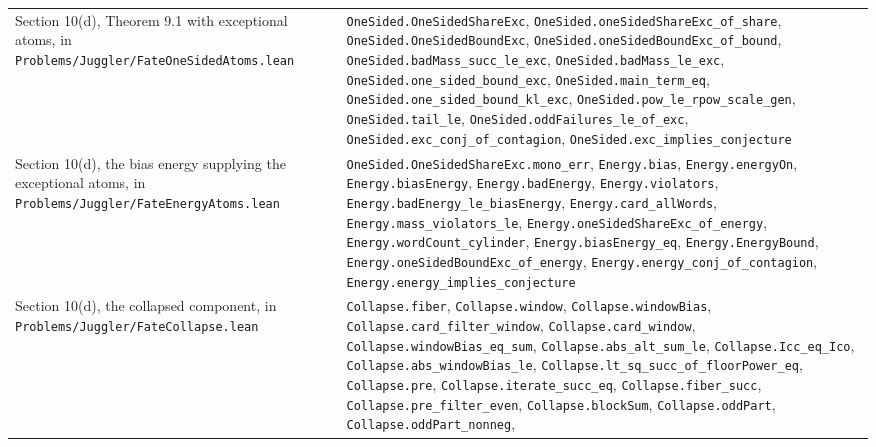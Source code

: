 \documentclass[11pt,a4paper]{article}
\begin{document}
\begin{longtable}[]{@{}
  >{\raggedright\arraybackslash}p{}
  >{\raggedright\arraybackslash}p{}@{}}
Section 10(d), Theorem 9.1 with exceptional atoms, in
\texttt{\nolinkurl{Problems/Juggler/FateOneSidedAtoms.lean}} &
\texttt{\nolinkurl{OneSided.OneSidedShareExc}},
\texttt{\nolinkurl{OneSided.oneSidedShareExc_of_share}},
\texttt{\nolinkurl{OneSided.OneSidedBoundExc}},
\texttt{\nolinkurl{OneSided.oneSidedBoundExc_of_bound}},
\texttt{\nolinkurl{OneSided.badMass_succ_le_exc}},
\texttt{\nolinkurl{OneSided.badMass_le_exc}},
\texttt{\nolinkurl{OneSided.one_sided_bound_exc}},
\texttt{\nolinkurl{OneSided.main_term_eq}},
\texttt{\nolinkurl{OneSided.one_sided_bound_kl_exc}},
\texttt{\nolinkurl{OneSided.pow_le_rpow_scale_gen}},
\texttt{\nolinkurl{OneSided.tail_le}},
\texttt{\nolinkurl{OneSided.oddFailures_le_of_exc}},
\texttt{\nolinkurl{OneSided.exc_conj_of_contagion}},
\texttt{\nolinkurl{OneSided.exc_implies_conjecture}} \\
Section 10(d), the bias energy supplying the exceptional atoms, in
\texttt{\nolinkurl{Problems/Juggler/FateEnergyAtoms.lean}} &
\texttt{\nolinkurl{OneSided.OneSidedShareExc.mono_err}},
\texttt{\nolinkurl{Energy.bias}}, \texttt{\nolinkurl{Energy.energyOn}},
\texttt{\nolinkurl{Energy.biasEnergy}},
\texttt{\nolinkurl{Energy.badEnergy}},
\texttt{\nolinkurl{Energy.violators}},
\texttt{\nolinkurl{Energy.badEnergy_le_biasEnergy}},
\texttt{\nolinkurl{Energy.card_allWords}},
\texttt{\nolinkurl{Energy.mass_violators_le}},
\texttt{\nolinkurl{Energy.oneSidedShareExc_of_energy}},
\texttt{\nolinkurl{Energy.wordCount_cylinder}},
\texttt{\nolinkurl{Energy.biasEnergy_eq}},
\texttt{\nolinkurl{Energy.EnergyBound}},
\texttt{\nolinkurl{Energy.oneSidedBoundExc_of_energy}},
\texttt{\nolinkurl{Energy.energy_conj_of_contagion}},
\texttt{\nolinkurl{Energy.energy_implies_conjecture}} \\
Section 10(d), the collapsed component, in
\texttt{\nolinkurl{Problems/Juggler/FateCollapse.lean}} &
\texttt{\nolinkurl{Collapse.fiber}},
\texttt{\nolinkurl{Collapse.window}},
\texttt{\nolinkurl{Collapse.windowBias}},
\texttt{\nolinkurl{Collapse.card_filter_window}},
\texttt{\nolinkurl{Collapse.card_window}},
\texttt{\nolinkurl{Collapse.windowBias_eq_sum}},
\texttt{\nolinkurl{Collapse.abs_alt_sum_le}},
\texttt{\nolinkurl{Collapse.Icc_eq_Ico}},
\texttt{\nolinkurl{Collapse.abs_windowBias_le}},
\texttt{\nolinkurl{Collapse.lt_sq_succ_of_floorPower_eq}},
\texttt{\nolinkurl{Collapse.pre}},
\texttt{\nolinkurl{Collapse.iterate_succ_eq}},
\texttt{\nolinkurl{Collapse.fiber_succ}},
\texttt{\nolinkurl{Collapse.pre_filter_even}},
\texttt{\nolinkurl{Collapse.blockSum}},
\texttt{\nolinkurl{Collapse.oddPart}},
\texttt{\nolinkurl{Collapse.oddPart_nonneg}},

\end{longtable}
\end{document}
